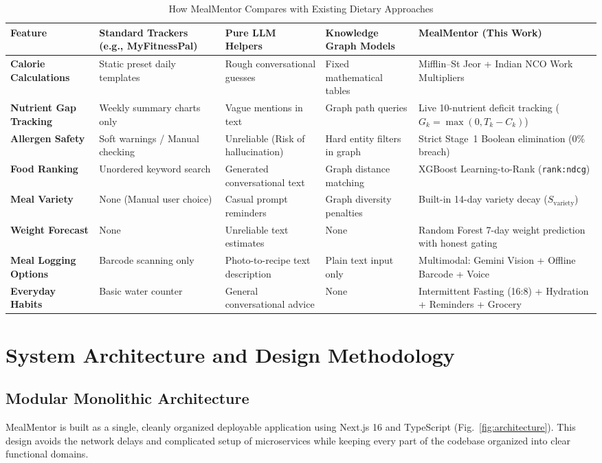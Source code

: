 \documentclass[10pt, conference, letterpaper]{IEEEtran}
\begin{document}
\begin{table}[t]
\centering
\caption{How MealMentor Compares with Existing Dietary Approaches}
\label{tab:comparison}
\footnotesize
\setlength{\tabcolsep}{4.5pt}
\begin{tabularx}{\textwidth}{>{\raggedright\arraybackslash\bfseries}p{2.5cm} *{4}{Y}}
\toprule
Feature & Standard Trackers (e.g., MyFitnessPal) & Pure LLM Helpers \cite{deng2026} & Knowledge Graph Models \cite{chen2021} & MealMentor (This Work) \\
\midrule
Calorie Calculations & Static preset daily templates & Rough conversational guesses & Fixed mathematical tables & Mifflin--St Jeor + Indian NCO Work Multipliers \\
Nutrient Gap Tracking & Weekly summary charts only & Vague mentions in text & Graph path queries & Live 10-nutrient deficit tracking ($G_k = \max(0, T_k - C_k)$) \\
Allergen Safety & Soft warnings / Manual checking & Unreliable (Risk of hallucination) & Hard entity filters in graph & Strict Stage~1 Boolean elimination ($0\%$ breach) \\
Food Ranking & Unordered keyword search & Generated conversational text & Graph distance matching & XGBoost Learning-to-Rank (\texttt{rank:ndcg}) \\
Meal Variety & None (Manual user choice) & Casual prompt reminders & Graph diversity penalties & Built-in 14-day variety decay ($S_{\text{variety}}$) \\
Weight Forecast & None & Unreliable text estimates & None & Random Forest 7-day weight prediction with honest gating \\
Meal Logging Options & Barcode scanning only & Photo-to-recipe text description & Plain text input only & Multimodal: Gemini Vision + Offline Barcode + Voice \\
Everyday Habits & Basic water counter & General conversational advice & None & Intermittent Fasting (16:8) + Hydration + Reminders + Grocery \\
\bottomrule
\end{tabularx}
\end{table}

\section{System Architecture and Design Methodology}

\subsection{Modular Monolithic Architecture}
MealMentor is built as a single, cleanly organized deployable application using Next.js 16 and TypeScript (Fig.~\ref{fig:architecture}). This design avoids the network delays and complicated setup of microservices while keeping every part of the codebase organized into clear functional domains.
\end{document}

